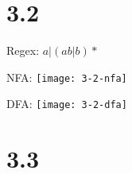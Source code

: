 \documentclass{article}
\begin{document}
\section*{3.2}

Regex: $a|(ab|b)*$

NFA: \texttt{[image: 3-2-nfa]}

DFA: \texttt{[image: 3-2-dfa]}

\section*{3.3}
\end{document}
